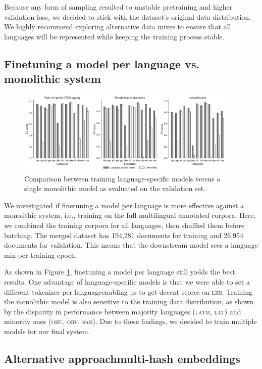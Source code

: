 \documentclass[11pt]{article}
\begin{document}
Because any form of sampling resulted to unstable pretraining and higher validation loss, we decided to stick with the dataset's original data distribution.
We highly recommend exploring alternative data mixes to ensure that all languages will be represented while keeping the training process stable.

\subsection{Finetuning a model per language vs. monolithic system}

\begin{figure}[t]
  \centering
  \includegraphics[width=0.95\textwidth]{figures/monolithic.pdf}
  \caption{Comparison between training language-specific models versus a single monolithic model as evaluated on the validation set.}
  \label{fig:monolithic}
\end{figure}

We investigated if finetuning a model per language is more effective against a monolithic system, i.e., training on the full multilingual annotated corpora.
Here, we combined the training corpora for all languages, then shuffled them before batching.
The merged dataset has 194,281 documents for training and 26,954 documents for validation.
This means that the downstream model sees a language mix per training epoch.

As shown in Figure \ref{fig:monolithic}, finetuning a model per language still yields the best results.
One advantage of language-specific models is that we were able to set a different tokenizer per language\textemdash enabling us to get decent scores on \textsc{lzh}.
Training the monolithic model is also sensitive to the training data distribution, as shown by the disparity in performance between majority languages (\textsc{latm}, \textsc{lat}) and minority ones (\textsc{ohu}, \textsc{orv}, \textsc{san}).
Due to these findings, we decided to train multiple models for our final system.

\subsection{Alternative approach\textemdash multi-hash embeddings}
\end{document}
